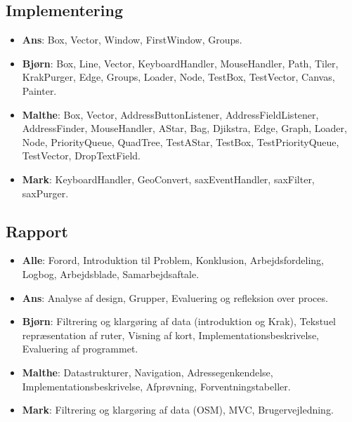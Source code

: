 \subsection{Implementering}

\begin{itemize}
	\item \textbf{Ans}: Box, Vector, Window, FirstWindow, Groups.
	\item \textbf{Bjørn}: Box, Line, Vector, KeyboardHandler, MouseHandler, Path, Tiler, KrakPurger, Edge, Groups, Loader, Node, TestBox, TestVector, Canvas, Painter.
	\item \textbf{Malthe}: Box, Vector, AddressButtonListener, AddressFieldListener, AddressFinder, MouseHandler, AStar, Bag, Djikstra, Edge, Graph, Loader, Node, PriorityQueue, QuadTree, TestAStar, TestBox, TestPriorityQueue, TestVector, DropTextField.
	\item \textbf{Mark}: KeyboardHandler, GeoConvert, saxEventHandler, saxFilter, saxPurger.
\end{itemize}

\subsection{Rapport}

\begin{itemize}
	\item \textbf{Alle}: Forord, Introduktion til Problem, Konklusion, Arbejdsfordeling, Logbog, Arbejdsblade, Samarbejdsaftale.
	\item \textbf{Ans}: Analyse af design, Grupper, Evaluering og refleksion over proces.
	\item \textbf{Bjørn}: Filtrering og klargøring af data (introduktion og Krak), Tekstuel repræsentation af ruter, Visning af kort, Implementationsbeskrivelse, Evaluering af programmet.
	\item \textbf{Malthe}: Datastrukturer, Navigation, Adressegenkendelse, Implementationsbeskrivelse, Afprøvning, Forventningstabeller.
	\item \textbf{Mark}: Filtrering og klargøring af data (OSM), MVC, Brugervejledning.
\end{itemize}